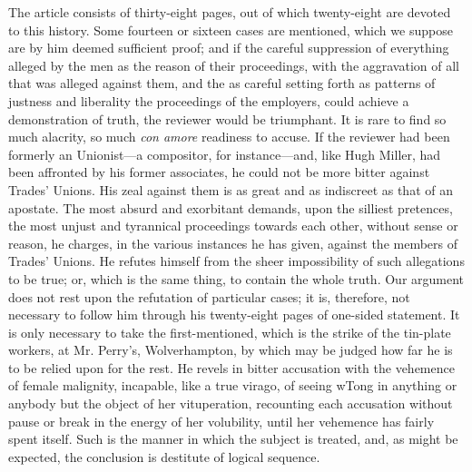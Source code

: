 The article consists of thirty-eight pages, out of which twenty-eight
are devoted to this history. Some fourteen or sixteen cases are
mentioned, which we suppose are by him deemed sufficient proof; and if
the careful suppression of everything alleged by the men as the reason
of their proceedings, with the aggravation of all that was alleged
against them, and the as careful setting forth as patterns of justness
and liberality the proceedings of the employers, could achieve a
demonstration of truth, the reviewer would be triumphant. It is rare to
find so much alacrity, so much \textit{con amore} readiness to accuse.
If the reviewer had been formerly an Unionist---a compositor, for
instance---and, like Hugh Miller, had been affronted by his former
associates, he could not be more bitter against Trades' Unions. His zeal
against them is as great and as indiscreet as that of an apostate. The
most absurd and exorbitant demands, upon the silliest pretences, the
most unjust and tyrannical proceedings towards each other, without sense
or reason, he charges, in the various instances he has given, against
the members of Trades' Unions. He refutes himself from the sheer
impossibility of such allegations to be true; or, which is the same
thing, to contain the whole truth. Our argument does not rest upon the
refutation of particular cases; it is, therefore, not necessary to
follow him through his twenty-eight pages of one-sided statement. It is
only necessary to take the first-mentioned, which is the strike of the
tin-plate workers, at Mr. Perry's, Wolverhampton, by which may be judged
how far he is to be relied upon for the rest. He revels in bitter
accusation with the vehemence of female malignity, incapable, like a
true virago, of seeing wTong in anything or anybody but the object of
her vituperation, recounting each accusation without pause or break in
the energy of her volubility, until her vehemence has fairly spent
itself. Such is the manner in which the subject is treated, and, as
might be expected, the conclusion is destitute of logical sequence.

